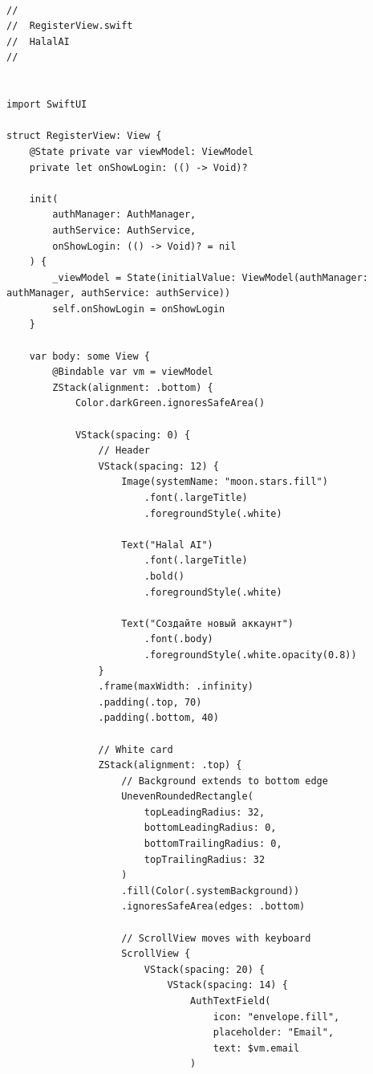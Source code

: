 \begin{lstlisting}[basicstyle=\tiny\ttfamily,breaklines=true]

//
//  RegisterView.swift
//  HalalAI
//


import SwiftUI

struct RegisterView: View {
    @State private var viewModel: ViewModel
    private let onShowLogin: (() -> Void)?

    init(
        authManager: AuthManager,
        authService: AuthService,
        onShowLogin: (() -> Void)? = nil
    ) {
        _viewModel = State(initialValue: ViewModel(authManager: authManager, authService: authService))
        self.onShowLogin = onShowLogin
    }

    var body: some View {
        @Bindable var vm = viewModel
        ZStack(alignment: .bottom) {
            Color.darkGreen.ignoresSafeArea()

            VStack(spacing: 0) {
                // Header
                VStack(spacing: 12) {
                    Image(systemName: "moon.stars.fill")
                        .font(.largeTitle)
                        .foregroundStyle(.white)

                    Text("Halal AI")
                        .font(.largeTitle)
                        .bold()
                        .foregroundStyle(.white)

                    Text("Создайте новый аккаунт")
                        .font(.body)
                        .foregroundStyle(.white.opacity(0.8))
                }
                .frame(maxWidth: .infinity)
                .padding(.top, 70)
                .padding(.bottom, 40)

                // White card
                ZStack(alignment: .top) {
                    // Background extends to bottom edge
                    UnevenRoundedRectangle(
                        topLeadingRadius: 32,
                        bottomLeadingRadius: 0,
                        bottomTrailingRadius: 0,
                        topTrailingRadius: 32
                    )
                    .fill(Color(.systemBackground))
                    .ignoresSafeArea(edges: .bottom)

                    // ScrollView moves with keyboard
                    ScrollView {
                        VStack(spacing: 20) {
                            VStack(spacing: 14) {
                                AuthTextField(
                                    icon: "envelope.fill",
                                    placeholder: "Email",
                                    text: $vm.email
                                )


\end{lstlisting}
